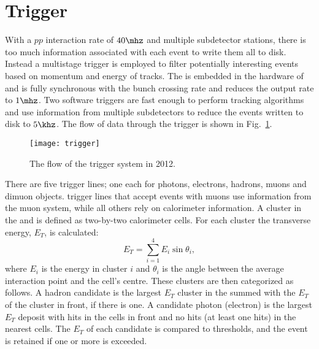 \section{Trigger}
\label{sec:lhcb:trig}

With a $pp$ interaction rate of $40\mhz$ and multiple subdetector stations, there is too much
information associated with each event to write them all to disk.
Instead a multistage trigger is employed to filter potentially interesting events based on momentum
and energy of tracks.
The \lone is embedded in the hardware of \lhcb and is fully synchronous with
the bunch crossing rate and reduces the output rate to $1\mhz$.
Two software triggers are fast enough to perform tracking algorithms and use information from
multiple subdetectors to reduce the events written to disk to $5\khz$.
The flow of data through the trigger is shown in Fig.~\ref{fig:lhcb:trigger}.

\begin{figure}
  \begin{center}
    \texttt{[image: trigger]}
  \end{center}
  \caption[LHCb trigger sequence in 2012]
  {\small
    The flow of the \lhcb trigger system in 2012.
  }
  \label{fig:lhcb:trigger}
\end{figure}

There are five \lone trigger lines; one each for photons, electrons, hadrons, muons and dimuon
objects.
\lone trigger lines that accept events with muons use information from the muon system, while all
others rely on calorimeter information.
A cluster in the \ecal and \hcal is defined as two-by-two calorimeter cells.
For each cluster the transverse energy, $E_T$, is calculated:
\begin{equation}
  E_T = \sum_{i=1}^4E_i\sin\theta_i,
\end{equation}
where $E_i$ is the energy in cluster $i$ and $\theta_i$ is the angle between the average
interaction point and the cell's centre.
These clusters are then categorized as follows.
A hadron candidate is the largest $E_T$ cluster in the \hcal summed with the $E_T$ of the \ecal
cluster in front, if there is one.
A candidate photon (electron) is the largest $E_T$ deposit with hits in the \presh cells in front and
no hits (at least one hits) in the nearest \spd cells.
The $E_T$ of each candidate is compared to thresholds, and the event is retained if one or more is
exceeded.

